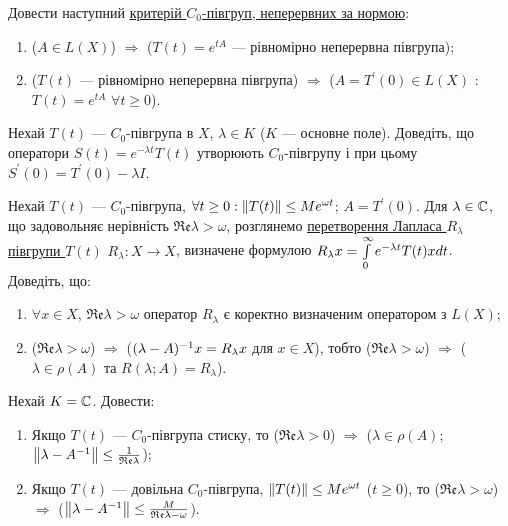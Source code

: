 
\begin{exercise}
    Довести наступний \ul{критерій $C_0$-півгруп, неперервних за 
    нормою}:
    \begin{enumerate}
        \item ($A \in L(X)$) $\Rightarrow$ ($T(t) = e^{tA}$ 
        --- рівномірно неперервна півгрупа);
        \item ($T(t)$ --- рівномірно неперервна півгрупа) $\Rightarrow$ 
        ($A = T^{\prime}(0) \in L(X)$ : $T(t) = e^{tA}$ $\forall t \geq 0$).
    \end{enumerate}
\end{exercise}

\begin{exercise}
    Нехай $T(t)$ --- $C_0$-півгрупа в $X$, $\lambda \in K$ ($K$ --- основне поле). Доведіть, 
    що оператори $S(t) = e^{-\lambda t}T(t)$ утворюють $C_0$-півгрупу і при цьому 
    $S^{\prime}(0) = T^{\prime}(0) - \lambda I$. 
\end{exercise}

\begin{exercise}
    Нехай $T(t)$ --- $C_0$-півгрупа, $\forall t \geq 0 : \left\lVert T(t)\right\rVert \leq Me^{\omega t}$;
    $A = T^{\prime}(0)$. Для $\lambda \in \mathbb{C}$, що задовольняє нерівність $\mathfrak{Re}\lambda > \omega$,
    розглянемо \ul{перетворення Лапласа $R_\lambda$ півгрупи $T(t)$} $R_\lambda : 
    X \rightarrow X$, визначене формулою $R_\lambda x = \int\limits_{0}^{\infty}e^{-\lambda t} T(t)
    x dt$. Доведіть, що:
    \begin{enumerate}
        \item $\forall x \in X$, $\mathfrak{Re} \lambda > \omega$ оператор 
        $R_\lambda$ є коректно визначеним оператором з $L(X)$;
        \item ($\mathfrak{Re} \lambda > \omega$) $\Rightarrow$ ($(\lambda - A)^{-1}x = R_\lambda x$ 
        для $x \in X$), тобто ($\mathfrak{Re} \lambda > \omega$) $\Rightarrow$ ($\lambda \in \rho(A)$
        та $R(\lambda; A) = R_\lambda$).
    \end{enumerate}
\end{exercise}

\begin{exercise}
    Нехай $K = \mathbb{C}$. Довести:
    \begin{enumerate}
        \item Якщо $T(t)$ --- $C_0$-півгрупа стиску, то ($\mathfrak{Re}\lambda > 0$) $\Rightarrow$
        ($\lambda \in \rho(A)$; $\left\lVert\lambda - A^{-1}\right\rVert \leq \frac{1}{\mathfrak{Re} \lambda}$);
        \item Якщо $T(t)$ --- довільна $C_0$-півгрупа, $\left\lVert T(t)\right\rVert \leq Me^{\omega t}$ 
        ($t \geq 0$), то ($\mathfrak{Re} \lambda > \omega$) $\Rightarrow$ 
        ($\left\lVert\lambda - A^{-1}\right\rVert \leq \frac{M}{\mathfrak{Re}\lambda - \omega}$).
    \end{enumerate}
\end{exercise}

